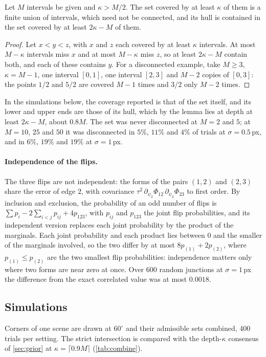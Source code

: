\begin{lemma}\label{lem:Sdepth}
Let $M$ intervals be given and $\kappa>M/2$. The set covered by at least $\kappa$ of them is a finite union of intervals, which need not be connected, and its hull is contained in the set covered by at least $2\kappa-M$ of them.
\end{lemma}
\begin{proof}
Let $x<y<z$, with $x$ and $z$ each covered by at least $\kappa$ intervals. At most $M-\kappa$ intervals miss $x$ and at most $M-\kappa$ miss $z$, so at least $2\kappa-M$ contain both, and each of these contains $y$. For a disconnected example, take $M\ge3$, $\kappa=M-1$, one interval $[0,1]$, one interval $[2,3]$ and $M-2$ copies of $[0,3]$: the points $1/2$ and $5/2$ are covered $M-1$ times and $3/2$ only $M-2$ times.
\end{proof}

In the simulations below, the coverage reported is that of the set itself, and its lower and upper ends are those of its hull, which by the lemma lies at depth at least $2\kappa-M$, about $0.8M$. The set was never disconnected at $M=2$ and $5$; at $M=10$, $25$ and $50$ it was disconnected in $5\%$, $11\%$ and $4\%$ of trials at $\sigma=0.5$\,px, and in $6\%$, $19\%$ and $19\%$ at $\sigma=1$\,px.

\paragraph{Independence of the flips.} The three flips are not independent: the forms of the pairs $(1,2)$ and $(2,3)$ share the error of edge $2$, with covariance $\tau^2\,\partial_{\psi_2}\Phi_{12}\,\partial_{\psi_2}\Phi_{23}$ to first order. By inclusion and exclusion, the probability of an odd number of flips is $\sum p_i-2\sum_{i<j}p_{ij}+4p_{123}$, with $p_{ij}$ and $p_{123}$ the joint flip probabilities, and its independent version replaces each joint probability by the product of the marginals. Each joint probability and each product lies between $0$ and the smaller of the marginals involved, so the two differ by at most $8p_{(1)}+2p_{(2)}$, where $p_{(1)}\le p_{(2)}$ are the two smallest flip probabilities: independence matters only where two forms are near zero at once. Over $600$ random junctions at $\sigma=1$\,px the difference from the exact correlated value was at most $0.0018$.

\subsection{Simulations}\label{sec:e6}
Corners of one scene are drawn at $60^\circ$ and their admissible sets combined, 400 trials per setting. The strict intersection is compared with the depth-$\kappa$ consensus of \cref{sec:prior} at $\kappa=\lceil 0.9M\rceil$ (\cref{tab:combine}).

